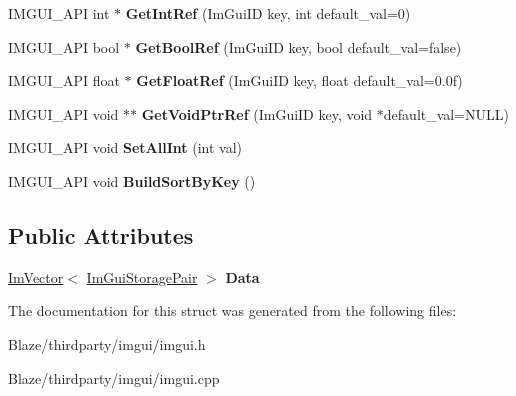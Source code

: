 \begin{DoxyCompactItemize}
\item 
\mbox{\label{structImGuiStorage_a28673fa7839263f3066ccb8e93e748a9}} 
I\+M\+G\+U\+I\+\_\+\+A\+PI int $\ast$ {\bfseries Get\+Int\+Ref} (Im\+Gui\+ID key, int default\+\_\+val=0)
\item 
\mbox{\label{structImGuiStorage_aeb0d62100453d710bac5f6ad0a6e6a2e}} 
I\+M\+G\+U\+I\+\_\+\+A\+PI bool $\ast$ {\bfseries Get\+Bool\+Ref} (Im\+Gui\+ID key, bool default\+\_\+val=false)
\item 
\mbox{\label{structImGuiStorage_a4b51cc8c92c65d4224af65a8ce7752ee}} 
I\+M\+G\+U\+I\+\_\+\+A\+PI float $\ast$ {\bfseries Get\+Float\+Ref} (Im\+Gui\+ID key, float default\+\_\+val=0.\+0f)
\item 
\mbox{\label{structImGuiStorage_a2b203317f3f488818e9b9f416fe35332}} 
I\+M\+G\+U\+I\+\_\+\+A\+PI void $\ast$$\ast$ {\bfseries Get\+Void\+Ptr\+Ref} (Im\+Gui\+ID key, void $\ast$default\+\_\+val=N\+U\+LL)
\item 
\mbox{\label{structImGuiStorage_ae5ee60618c4ce8e2b4ce0e5543d52992}} 
I\+M\+G\+U\+I\+\_\+\+A\+PI void {\bfseries Set\+All\+Int} (int val)
\item 
\mbox{\label{structImGuiStorage_a5eae75e98a65c146e99898e359225f99}} 
I\+M\+G\+U\+I\+\_\+\+A\+PI void {\bfseries Build\+Sort\+By\+Key} ()
\end{DoxyCompactItemize}
\subsection*{Public Attributes}
\begin{DoxyCompactItemize}
\item 
\mbox{\label{structImGuiStorage_a632c9d57791b68bfe671c748e9c54bc0}} 
\hyperlink{structImVector}{Im\+Vector}$<$ \hyperlink{structImGuiStorage_1_1ImGuiStoragePair}{Im\+Gui\+Storage\+Pair} $>$ {\bfseries Data}
\end{DoxyCompactItemize}


The documentation for this struct was generated from the following files\+:\begin{DoxyCompactItemize}
\item 
Blaze/thirdparty/imgui/imgui.\+h\item 
Blaze/thirdparty/imgui/imgui.\+cpp\end{DoxyCompactItemize}
